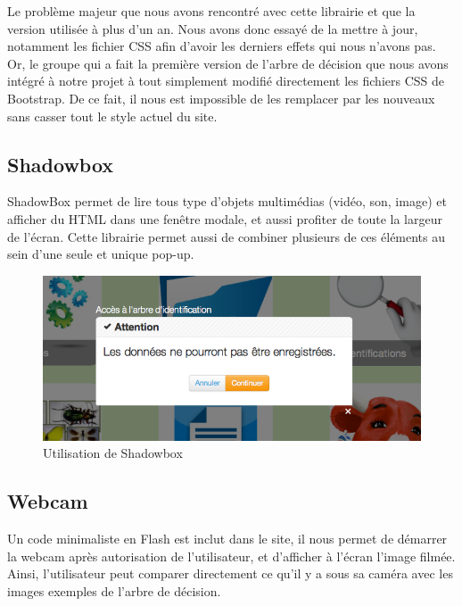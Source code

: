 \documentclass[twoside]{EPURapport}
\begin{document}
		Le problème majeur que nous avons rencontré avec cette librairie et que la version utilisée à plus d'un an. Nous avons donc essayé de la mettre à jour, notamment les fichier CSS afin d'avoir les derniers effets qui nous n'avons pas. Or, le groupe qui a fait la première version de l'arbre de décision que nous avons intégré à notre projet à tout simplement modifié directement les fichiers CSS de Bootstrap. De ce fait, il nous est impossible de les remplacer par les nouveaux sans casser tout le style actuel du site.
		
		\subsection{Shadowbox}
		\label{lib:shadowbox}
		ShadowBox permet de lire tous type d'objets multimédias (vidéo, son, image) et afficher du HTML dans une fenêtre modale, et aussi profiter de toute la largeur de l'écran. Cette librairie permet aussi de combiner plusieurs de ces éléments au sein d'une seule et unique pop-up.
		
		\begin{figure}[h!]
			\centering
			\includegraphics[scale=0.5]{images/lib-shadowbox.png}
			\caption{Utilisation de Shadowbox}
		\end{figure}
		
		\subsection{Webcam}
		\label{lib:webcam}
		Un code minimaliste en Flash est inclut dans le site, il nous permet de démarrer la webcam après autorisation de l'utilisateur, et d'afficher à l'écran l'image filmée. Ainsi, l'utilisateur peut comparer directement ce qu'il y a sous sa caméra avec les images exemples de l'arbre de décision.
		
\end{document}
